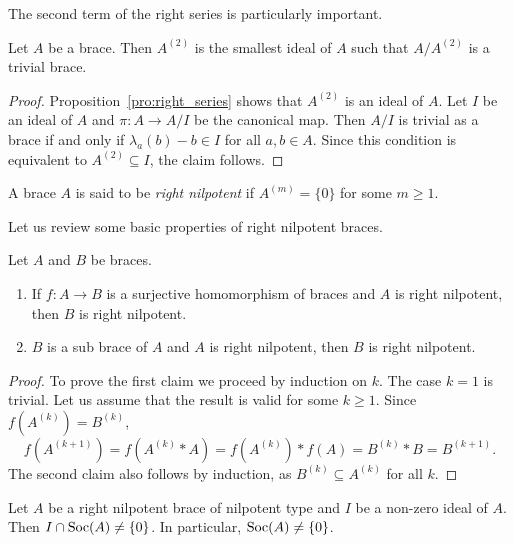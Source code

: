The second term of the right series is particularly important.

\begin{proposition}
 Let $A$ be a brace. Then $A^{(2)}$ is the smallest ideal of $A$
 such that $A/A^{(2)}$ is a trivial brace.
\end{proposition}

\begin{proof}
    Proposition~\ref{pro:right_series} shows that $A^{(2)}$ is an ideal of $A$. 
    Let $I$ be an ideal of $A$ and $\pi\colon A\to A/I$ be the canonical map. Then
    $A/I$ is trivial as a brace if and only if $\lambda_a(b)-b\in I$ for all
    $a,b\in A$. Since this condition is equivalent to $A^{(2)}\subseteq I$, the claim
    follows.
\end{proof}

\begin{definition}
    A brace $A$ is said to be \emph{right nilpotent}
    if $A^{(m)}=\{0\}$ for some $m\geq1$.
\end{definition}

Let us review some basic properties of right nilpotent braces. 

\begin{lemma}
    \label{lem:right_nilpotent:quotient}
    Let $A$ and $B$ be braces. 
    \begin{enumerate}
        \item If $f\colon A\to B$ is a surjective homomorphism of braces and 
        $A$ is right nilpotent, then $B$ is right nilpotent.
        \item $B$ is a sub brace of $A$ and $A$ is right nilpotent, then 
        $B$ is right nilpotent.
    \end{enumerate}
\end{lemma}

\begin{proof}
    To prove the first claim we proceed by induction on $k$. 
    The case $k=1$ is trivial. Let us assume that the result 
    is valid for some $k\geq1$. Since
    $f(A^{(k)})=B^{(k)}$,
    \[
    f(A^{(k+1)})=f(A^{(k)}*A)=f(A^{(k)})*f(A)=B^{(k)}*B=B^{(k+1)}.
    \]
    The second claim also follows by induction, as $B^{(k)}\subseteq A^{(k)}$ for all $k$. 
\end{proof}

\begin{theorem}
    \label{thm:IcapSoc}
    Let $A$ be a right nilpotent brace of nilpotent type
    and $I$ be a non-zero ideal of $A$. Then $I\cap\operatorname{Soc}(A)\ne\{0\}$. 
    In particular,  $\operatorname{Soc}(A)\ne\{0\}$.
\end{theorem}

